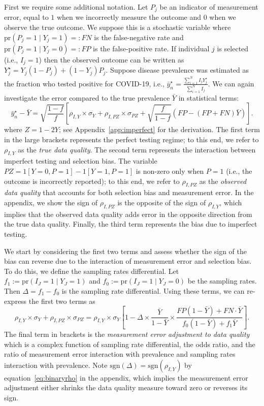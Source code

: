 \documentclass[aoas]{amsart}
\def\pr{\text{pr}}
\def\sgn{\text{sgn}}
\begin{document}
First we require some additional notation.  Let $P_j$ be an indicator of measurement error, equal to $1$ when we incorrectly measure the outcome and $0$ when we observe the true outcome. We suppose this is a stochastic variable where $\pr(P_j = 1 \mid Y_j = 1) =: FN$ is the false-negative rate and $\pr(P_j = 1 \mid Y_j = 0) =: FP$ is the false-positive rate.  If individual $j$ is selected (i.e., $I_j = 1$) then the observed outcome can be written as $Y_j^{\star} = Y_j(1-P_j) + (1-Y_j) P_j$.  Suppose disease prevalence was estimated as the fraction who tested positive for COVID-19, i.e., $\bar y_n^\star = \frac{\sum_{i=1}^N I_j Y_j^\star}{\sum_{i=1}^N I_j}$.  We can again investigate the error compared to the true prevalence $\bar Y$ in statistical terms:
$$
\bar y_n^\star - \bar Y = \sqrt{\frac{1-f}{f}} \left[ \rho_{I,Y} \times \sigma_Y + \rho_{I,PZ} \times \sigma_{PZ} + \sqrt{\frac{f}{1-f}}  \left( FP - (FP+FN) \bar Y \right) \right] .
$$
where $Z = 1-2Y$; see Appendix~\ref{app:imperfect} for the derivation. The first term in the large brackets represents the perfect testing regime; to this end, we refer to $\rho_{I,Y}$ as the \emph{true data quality}.  The second term represents the interaction between imperfect testing and selection bias. The variable $PZ = 1[Y=0,P=1] - 1[Y=1, P=1]$ is non-zero only when $P=1$ (i.e., the outcome is incorrectly reported); to this end, we refer to $\rho_{I,PZ}$ as the \emph{observed data quality} that accounts for both selection bias and measurement error.  In the appendix, we show the sign of $\rho_{I,PZ}$ is the opposite of the sign of $\rho_{I,Y}$, which implies that the observed data quality adds error in the opposite direction from the true data quality.  Finally, the third term represents the bias due to imperfect testing.

We start by considering the first two terms and assess whether the sign of the bias can reverse due to the interaction of measurement error and selection bias.  To do this, we define the sampling rates differential.  Let $f_1 := \pr (I_J = 1 \mid Y_J = 1)$ and $f_0 := \pr(I_J = 1 \mid Y_J = 0)$ be the sampling rates.  Then $\Delta = f_1 - f_0$ is the sampling rate differential.  Using these terms, we can re-express the first two terms as
$$
\rho_{I,Y} \times \sigma_Y + \rho_{I,PZ} \times \sigma_{PZ} =
\rho_{I,Y} \times \sigma_Y \left[ 1 - \Delta \times \frac{\bar Y}{1-\bar Y} \times \frac{FP(1-\bar Y) + FN \cdot \bar Y}{f_0 (1-\bar Y) + f_1 \bar Y} \right].
$$
The final term in brackets is the \emph{measurement error adjustment to data quality} which is a complex function of sampling rate differential, the odds ratio, and the ratio of measurement error interaction with prevalence and sampling rates interaction with prevalence. Note $\sgn(\Delta) = \sgn(\rho_{I,Y})$ by equation~\ref{eq:binaryrho} in the appendix, which implies the measurement error adjustment either shrinks the data quality measure toward zero or reverses its sign.
\end{document}
